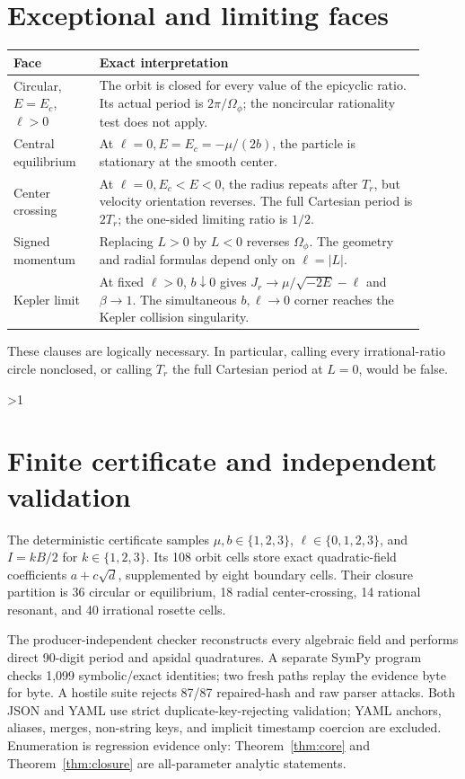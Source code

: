\documentclass[10pt]{article}
\providecommand{\CRevisionRound}{2}
\newcommand{\abs}[1]{\lvert#1\rvert}
\begin{document}
\section{Exceptional and limiting faces}
\begin{center}
\small
\begin{tabular}{>{\raggedright\arraybackslash}p{0.19\linewidth}p{0.72\linewidth}}
\toprule
Face & Exact interpretation \\
\midrule
Circular, \(E=E_c\), \(\ell>0\) & The orbit is closed for every value of the epicyclic ratio.  Its actual period is \(2\pi/\Omega_\phi\); the noncircular rationality test does not apply.\\
Central equilibrium & At \(\ell=0,E=E_c=-\mu/(2b)\), the particle is stationary at the smooth center.\\
Center crossing & At \(\ell=0,E_c<E<0\), the radius repeats after \(T_r\), but velocity orientation reverses.  The full Cartesian period is \(2T_r\); the one-sided limiting ratio is \(1/2\).\\
Signed momentum & Replacing \(L>0\) by \(L<0\) reverses \(\Omega_\phi\).  The geometry and radial formulas depend only on \(\ell=\abs L\).\\
Kepler limit & At fixed \(\ell>0\), \(b\downarrow0\) gives \(J_r\to\mu/\sqrt{-2E}-\ell\) and \(\beta\to1\).  The simultaneous \(b,\ell\to0\) corner reaches the Kepler collision singularity.\\
\bottomrule
\end{tabular}
\end{center}
These clauses are logically necessary.  In particular, calling every
irrational-ratio circle nonclosed, or calling \(T_r\) the full Cartesian
period at \(L=0\), would be false.
\fi

\ifnum\CRevisionRound>1
\section{Finite certificate and independent validation}
The deterministic certificate samples
\(\mu,b\in\{1,2,3\}\), \(\ell\in\{0,1,2,3\}\), and
\(I=kB/2\) for \(k\in\{1,2,3\}\).  Its 108 orbit cells store exact
quadratic-field coefficients \(a+c\sqrt d\), supplemented by eight
boundary cells.  Their closure partition is 36 circular or equilibrium,
18 radial center-crossing, 14 rational resonant, and 40 irrational rosette
cells.

The producer-independent checker reconstructs every algebraic field and
performs direct 90-digit period and apsidal quadratures.  A separate SymPy
program checks 1,099 symbolic/exact identities; two fresh paths replay the
evidence byte for byte.  A hostile suite rejects 87/87 repaired-hash and raw
parser attacks.  Both JSON and YAML use strict duplicate-key-rejecting
validation; YAML anchors, aliases, merges, non-string keys, and implicit
timestamp coercion are excluded.  Enumeration is regression evidence only:
Theorem~\ref{thm:core} and Theorem~\ref{thm:closure} are all-parameter
analytic statements.
\end{document}
